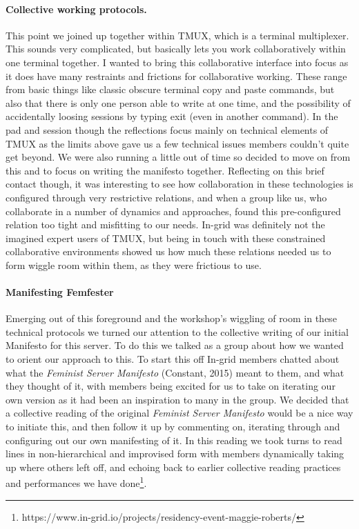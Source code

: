 \hypertarget{collective-working-protocols.}{%
\paragraph{Collective working
protocols.}\label{collective-working-protocols.}}

This point we joined up together within TMUX, which is a terminal
multiplexer. This sounds very complicated, but basically lets you work
collaboratively within one terminal together. I wanted to bring this
collaborative interface into focus as it does have many restraints and
frictions for collaborative working. These range from basic things like
classic obscure terminal copy and paste commands, but also that there is
only one person able to write at one time, and the possibility of
accidentally loosing sessions by typing exit (even in another command).
In the pad and session though the reflections focus mainly on technical
elements of TMUX as the limits above gave us a few technical issues
members couldn't quite get beyond. We were also running a little out of
time so decided to move on from this and to focus on writing the
manifesto together. Reflecting on this brief contact though, it was
interesting to see how collaboration in these technologies is configured
through very restrictive relations, and when a group like us, who
collaborate in a number of dynamics and approaches, found this
pre-configured relation too tight and misfitting to our needs. In-grid
was definitely not the imagined expert users of TMUX, but being in touch
with these constrained collaborative environments showed us how much
these relations needed us to form wiggle room within them, as they were
frictious to use.

\hypertarget{manifesting-femfester}{%
\paragraph{Manifesting Femfester}\label{manifesting-femfester}}

Emerging out of this foreground and the workshop's wiggling of room in
these technical protocols we turned our attention to the collective
writing of our initial Manifesto for this server. To do this we talked
as a group about how we wanted to orient our approach to this. To start
this off In-grid members chatted about what the \emph{Feminist Server
Manifesto} (Constant, 2015) meant to them, and what they thought of it,
with members being excited for us to take on iterating our own version
as it had been an inspiration to many in the group. We decided that a
collective reading of the original \emph{Feminist Server Manifesto}
would be a nice way to initiate this, and then follow it up by
commenting on, iterating through and configuring out our own manifesting
of it. In this reading we took turns to read lines in non-hierarchical
and improvised form with members dynamically taking up where others left
off, and echoing back to earlier collective reading practices and
performances we have done\footnote{https://www.in-grid.io/projects/residency-event-maggie-roberts/}.

